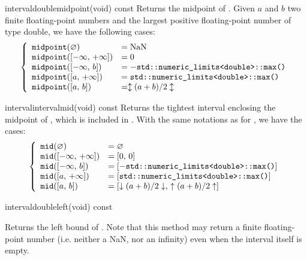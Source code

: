 \documentclass{manual}
\newcommand{\itv}[2]{\ensuremath{[#1,\,#2]}}
\newcommand{\roundDn}[1]{\ensuremath{\downarrow#1\downarrow}}
\newcommand{\roundUp}[1]{\ensuremath{\uparrow#1\uparrow}}
\newcommand{\roundNearest}[1]{\ensuremath{\updownarrow#1\updownarrow}}
\let\emptyset=\varnothing
\begin{document}
\begin{defmethod}{interval}{double}{midpoint}{(void) const}
  Returns the midpoint of . Given $a$ and $b$ two finite
  floating-point numbers and  the largest positive
  floating-point number of type double, we have the following cases:
\begin{equation*}
\left\{\begin{array}{ll}
\code{midpoint}(\emptyset{})&=\text{NaN}\\
\code{midpoint}(\itv{-\infty}{+\infty})&=0\\
\code{midpoint}(\itv{-\infty}{b})&=-\code{std::numeric\_limits<double>::max()}\\
\code{midpoint}(\itv{a}{+\infty})&=\code{std::numeric\_limits<double>::max()}\\
\code{midpoint}(\itv{a}{b})&=\roundNearest{(a+b)/2} \\
\end{array}\right.
\end{equation*}
\end{defmethod}

\begin{defmethod}{interval}{interval}{mid}{(void) const}
  Returns the tightest interval enclosing the midpoint of , which is
  included in .
  With the same notations as for , we have the cases:
\begin{equation*}
\left\{\begin{array}{ll}
\code{mid}(\emptyset{})&=\emptyset{}\\
\code{mid}(\itv{-\infty}{+\infty})&=\itv{0}{0}\\
\code{mid}(\itv{-\infty}{b})&=[-\code{std::numeric\_limits<double>::max()}]\\
\code{mid}(\itv{a}{+\infty})&=[\code{std::numeric\_limits<double>::max()}]\\
\code{mid}(\itv{a}{b})&=\itv{\roundDn{(a+b)/2}}{\roundUp{(a+b)/2}}
\end{array}\right.
\end{equation*}
\end{defmethod}

\begin{defmethod}{interval}{double}{left}{(void) const}
  \begin{operation}
    \op{$\code{left}(\itv{x}{y})=x$}
  \end{operation}
  Returns the left bound of . Note that this method may return a finite
  floating-point number (i.e. neither a NaN, nor an infinity) even when the
  interval itself is empty.
\end{defmethod}
\end{document}
